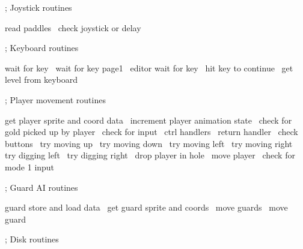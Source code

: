 \documentclass[10pt]{report}%
\begin{document}
    ; Joystick routines

    \LA{}read paddles~{\nwtagstyle{}}\RA{}
    \LA{}check joystick or delay~{\nwtagstyle{}}\RA{}

    ; Keyboard routines

    \LA{}wait for key~{\nwtagstyle{}}\RA{}
    \LA{}wait for key page1~{\nwtagstyle{}}\RA{}
    \LA{}editor wait for key~{\nwtagstyle{}}\RA{}
    \LA{}hit key to continue~{\nwtagstyle{}}\RA{}
    \LA{}get level from keyboard~{\nwtagstyle{}}\RA{}

    ; Player movement routines

    \LA{}get player sprite and coord data~{\nwtagstyle{}}\RA{}
    \LA{}increment player animation state~{\nwtagstyle{}}\RA{}
    \LA{}check for gold picked up by player~{\nwtagstyle{}}\RA{}
    \LA{}check for input~{\nwtagstyle{}}\RA{}
    \LA{}ctrl handlers~{\nwtagstyle{}}\RA{}
    \LA{}return handler~{\nwtagstyle{}}\RA{}
    \LA{}check buttons~{\nwtagstyle{}}\RA{}
    \LA{}try moving up~{\nwtagstyle{}}\RA{}
    \LA{}try moving down~{\nwtagstyle{}}\RA{}
    \LA{}try moving left~{\nwtagstyle{}}\RA{}
    \LA{}try moving right~{\nwtagstyle{}}\RA{}
    \LA{}try digging left~{\nwtagstyle{}}\RA{}
    \LA{}try digging right~{\nwtagstyle{}}\RA{}
    \LA{}drop player in hole~{\nwtagstyle{}}\RA{}
    \LA{}move player~{\nwtagstyle{}}\RA{}
    \LA{}check for mode 1 input~{\nwtagstyle{}}\RA{}

    ; Guard AI routines

    \LA{}guard store and load data~{\nwtagstyle{}}\RA{}
    \LA{}get guard sprite and coords~{\nwtagstyle{}}\RA{}
    \LA{}move guards~{\nwtagstyle{}}\RA{}
    \LA{}move guard~{\nwtagstyle{}}\RA{}

    ; Disk routines
\end{document}
